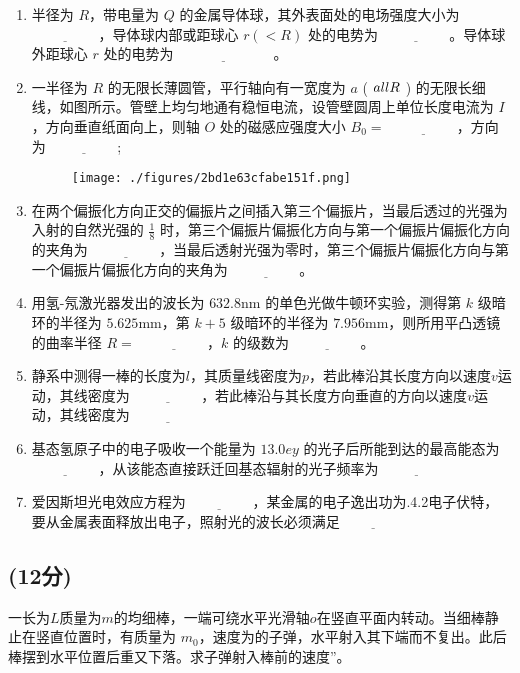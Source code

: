     \begin{enumerate}
    \item 半径为 $R$，带电量为 $Q$ 的金属导体球，其外表面处的电场强度大小为 $\underline{\hspace{2cm}}$，导体球内部或距球心 $r (< R)$ 处的电势为 $\underline{\hspace{2cm}}$。导体球外距球心 $r$ 处的电势为$ \underline{\hspace{3cm}}$。
    \item 一半径为 $R$ 的无限长薄圆管，平行轴向有一宽度为 $a$ ( $a \\ll R$ ) 的无限长细线，如图所示。管壁上均匀地通有稳恒电流，设管壁圆周上单位长度电流为 $I$，方向垂直纸面向上，则轴 $O$ 处的磁感应强度大小 $B_0 =$ $\underline{\hspace{2cm}}$，方向为 $\underline{\hspace{2cm}}$;
    \begin{figure}[ht]
    \centering
    \texttt{[image: ./figures/2bd1e63cfabe151f.png]}
    \caption{} \label{fig_NIU06_3}
    \end{figure}
    \item 在两个偏振化方向正交的偏振片之间插入第三个偏振片，当最后透过的光强为入射的自然光强的 $\frac{1}{8}$ 时，第三个偏振片偏振化方向与第一个偏振片偏振化方向的夹角为 $\underline{\hspace{2cm}}$，当最后透射光强为零时，第三个偏振片偏振化方向与第一个偏振片偏振化方向的夹角为 $\underline{\hspace{2cm}}$。
    \item 用氢-氖激光器发出的波长为 $632.8\text{nm}$ 的单色光做牛顿环实验，测得第 $k$ 级暗环的半径为 $5.625\text{mm}$，第 $k+5$ 级暗环的半径为 $7.956\text{mm}$，则所用平凸透镜的曲率半径 $R =$ $\underline{\hspace{2cm}}$，$k$ 的级数为 $\underline{\hspace{2cm}}$。
    \item 静系中测得一棒的长度为$l$，其质量线密度为$p$，若此棒沿其长度方向以速度$v$运动，其线密度为 $\underline{\hspace{2cm}}$，若此棒沿与其长度方向垂直的方向以速度$v$运动，其线密度为 $\underline{\hspace{2cm}}$
    \item 基态氢原子中的电子吸收一个能量为 $13.0ey$ 的光子后所能到达的最高能态为  $\underline{\hspace{2cm}}$，从该能态直接跃迁回基态辐射的光子频率为 $\underline{\hspace{2cm}}$
    \item 爱因斯坦光电效应方程为$\underline{\hspace{2cm}}$，某金属的电子逸出功为.4.2电子伏特，要从金属表面释放出电子，照射光的波长必须满足$\underline{\hspace{2cm}}$
\end{enumerate}

\subsection{(12分)}
一长为$L$质量为$m$的均细棒，一端可绕水平光滑轴$o$在竖直平面内转动。当细棒静止在竖直位置时，有质量为 $m_0$，速度为的子弹，水平射入其下端而不复出。此后棒摆到水平位置后重又下落。求子弹射入棒前的速度”。
